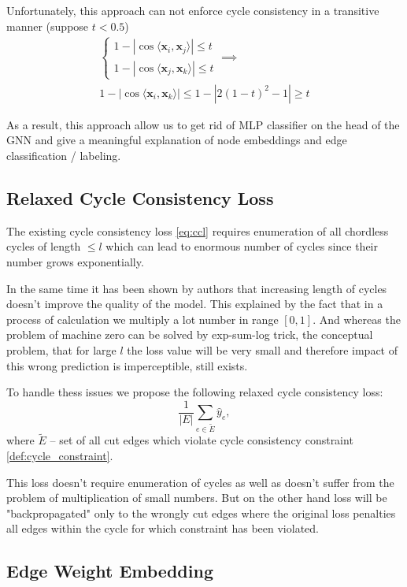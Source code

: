 \documentclass[10pt, twocolumn, a4paper]{article}
\theoremstyle{definition}
\begin{document}
Unfortunately, this approach can not enforce cycle consistency in a transitive manner
(suppose $t < 0.5$)
\begin{multline*}
    \begin{cases}
        1 - |\cos \langle \mathbf{x}_i, \mathbf{x}_j \rangle| \leq t \\
        1 - |\cos \langle \mathbf{x}_j, \mathbf{x}_k \rangle| \leq t
    \end{cases} \implies \\
    1 - |\cos \langle \mathbf{x}_i, \mathbf{x}_k \rangle| \leq
    1 - |2(1 - t)^2 - 1| \geq t
\end{multline*}

As a result, this approach allow us to get rid of MLP classifier on the head of the GNN and give a
meaningful explanation of node embeddings and edge classification / labeling.

\subsection{Relaxed Cycle Consistency Loss}
The existing cycle consistency loss \eqref{eq:ccl} requires enumeration of all
chordless cycles of length $\leq l$ which can lead to enormous number of cycles since
their number grows exponentially.

In the same time it has been shown by authors that increasing length of cycles
doesn't improve the quality of the model. This explained by the fact that in a process of calculation
we multiply a lot number in range $[0, 1]$. And whereas the problem of machine zero can be solved by
exp-sum-log trick, the conceptual problem, that for large $l$ the loss value will be very small and
therefore impact of this wrong prediction is imperceptible, still exists.

To handle thess issues we propose the following relaxed cycle consistency loss:
\[
    \frac{1}{|E|} \sum\limits_{e \in \tilde{E}} \hat{y}_e,
\]
where $\tilde{E}$ -- set of all cut edges which violate cycle consistency constraint \eqref{def:cycle_constraint}.

This loss doesn't require enumeration of cycles as well as doesn't suffer from the problem of
multiplication of small numbers. But on the other hand loss will be "backpropagated" only to the
wrongly cut edges where the original loss penalties all edges within the cycle for which constraint
has been violated.

\subsection{Edge Weight Embedding}
\end{document}
